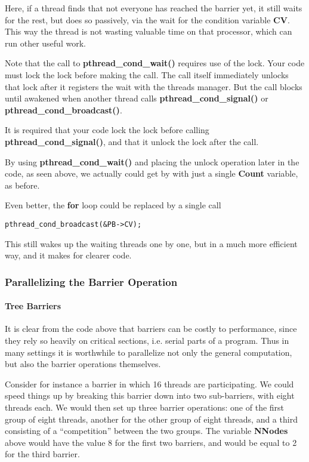 Here, if a thread finds that not everyone has reached the barrier
yet, it still waits for the rest, but does so passively, via the
wait for the condition variable {\bf CV}.  This way the thread is not
wasting valuable time on that processor, which can run other useful
work.

Note that the call to {\bf pthread\_cond\_wait()} requires use of the
lock.  Your code must lock the lock before making the call.  The call
itself immediately unlocks that lock after it registers the wait with
the threads manager.  But the call blocks until awakened when another
thread calls {\bf pthread\_cond\_signal()} or {\bf
pthread\_cond\_broadcast()}.

It is required that your code lock the lock before calling {\bf
pthread\_cond\_signal()}, and that it unlock the lock after the call.

By using {\bf pthread\_cond\_wait()} and placing the unlock operation
later in the code, as seen above, we actually could get by with just a
single {\bf Count} variable, as before.

Even better, the {\bf for} loop could be replaced by a single call

\begin{Verbatim}[fontsize=\relsize{-2}]
pthread_cond_broadcast(&PB->CV);
\end{Verbatim}

This still wakes up the waiting threads one by one, but in a much more
efficient way, and it makes for clearer code.

\subsubsection{Parallelizing the Barrier Operation}

\paragraph{Tree Barriers}

It is clear from the code above that barriers can be costly to
performance, since they rely so heavily on critical sections, i.e.
serial parts of a program.  Thus in many settings it is worthwhile to
parallelize not only the general computation, but also the barrier
operations themselves.

Consider for instance a barrier in which 16 threads are participating.
We could speed things up by breaking this barrier down into two
sub-barriers, with eight threads each.  We would then set up three
barrier operations:  one of the first group of eight threads, another
for the other group of eight threads, and a third consisting of a
``competition'' between the two groups.   The variable
{\bf NNodes} above would have the value 8 for the first two barriers,
and would be equal to 2 for the third barrier.

